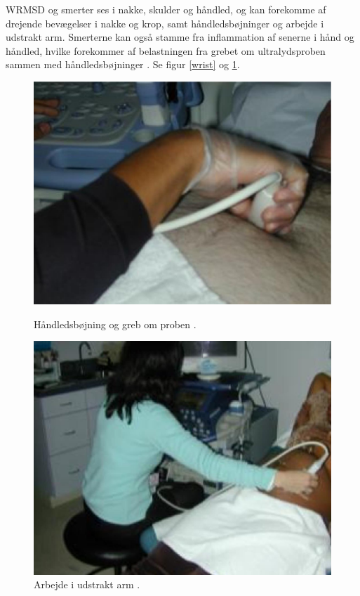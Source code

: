 WRMSD og smerter ses i nakke, skulder og håndled, og kan forekomme af drejende bevægelser i nakke og krop, samt håndledsbøjninger og arbejde i udstrakt arm. Smerterne kan også stamme fra inflammation af senerne i hånd og håndled, hvilke forekommer af belastningen fra grebet om ultralydsproben sammen med håndledsbøjninger \cite{1}\cite{24}\cite{31}\cite{32}\cite{36}. Se figur \ref{wrist} og \ref{udstraktArm}.

\begin{figure}[H]
  \begin{minipage}{0.49\textwidth}
    \centering
      \includegraphics[width=\textwidth]{Figurer/wrist.jpg}
      \caption{Håndledsbøjning og greb om proben \cite{31}.}
    \label{wrist}
  \end{minipage}
  \hspace{0.02\textwidth}
  \begin{minipage}{0.47\textwidth}
    \centering
      \includegraphics[width=\textwidth]{Figurer/arm.jpg}
      \caption{Arbejde i udstrakt arm \cite{31}.}
    \label{udstraktArm}
  \end{minipage}
\end{figure}

